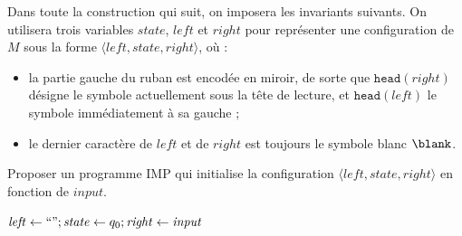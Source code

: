 \begin{exercice}
  Dans toute la construction qui suit, on imposera les invariants suivants.
  On utilisera trois variables $\mathit{state}$, $\mathit{left}$ et $\mathit{right}$
  pour représenter une configuration de $M$ sous la forme
  $\langle \mathit{left}, \mathit{state}, \mathit{right} \rangle$,
  où :
  \begin{itemize}
  \item la partie gauche du ruban est encodée en miroir, de sorte que
    $\texttt{head}(\mathit{right})$ désigne le symbole actuellement sous la tête de lecture,
    et $\texttt{head}(\mathit{left})$ le symbole immédiatement à sa gauche ;
  \item le dernier caractère de $\mathit{left}$ et de $\mathit{right}$ est toujours
    le symbole blanc $\blank$.
  \end{itemize}

  \pagebreak
  
  \begin{questions}
  \item Proposer un programme IMP qui initialise la configuration $\langle \mathit{left}, \mathit{state}, \mathit{right} \rangle$
    en fonction de $\mathit{input}$.
  \end{questions}
  \begin{corrections}
    $\mathit{left} \leftarrow ``" ; \mathit{state} \leftarrow q_0 ; \mathit{right} \leftarrow \mathit{input}$
  \end{corrections}
  

\end{exercice}
